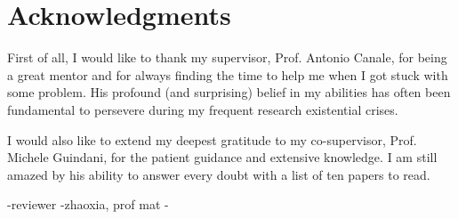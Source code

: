 \chapter*{Acknowledgments} 

First of all, I would like to thank my supervisor, Prof. Antonio Canale, for being a great mentor and for always finding the time to help me when I got stuck with some problem. His profound (and surprising) belief in my abilities has often been fundamental to persevere during my frequent research existential crises.

I would also like to extend my deepest gratitude to my co-supervisor, Prof. Michele Guindani, for the patient guidance and extensive knowledge. I am still amazed by his ability to answer every doubt with a list of ten papers to read.

-reviewer
-zhaoxia, prof mat
-